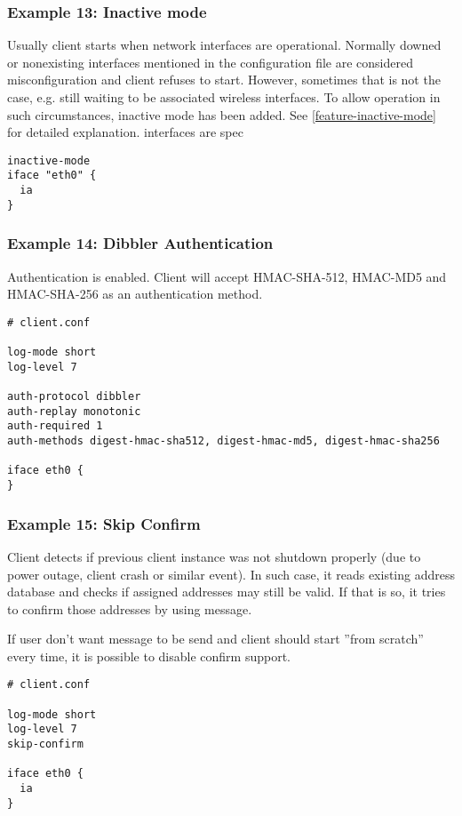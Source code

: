 \subsubsection{Example 13: Inactive mode}
\label{example-client-inactivemode}
Usually client starts when network interfaces are
operational. Normally downed or nonexisting interfaces mentioned in
the configuration file are considered misconfiguration and client
refuses to start. However, sometimes that is not the case, e.g. still
waiting to be associated wireless interfaces. To allow operation in
such circumstances, inactive mode has been added. See
\ref{feature-inactive-mode} for detailed explanation.
interfaces are spec

\begin{lstlisting}
inactive-mode
iface "eth0" {
  ia
}
\end{lstlisting}

\subsubsection{Example 14: Dibbler Authentication}
\label{example-client-auth}
Authentication is enabled. Client will accept HMAC-SHA-512, HMAC-MD5
and HMAC-SHA-256 as an authentication method.

\begin{lstlisting}
# client.conf

log-mode short
log-level 7

auth-protocol dibbler
auth-replay monotonic
auth-required 1
auth-methods digest-hmac-sha512, digest-hmac-md5, digest-hmac-sha256

iface eth0 {
}
\end{lstlisting}

\subsubsection{Example 15: Skip Confirm}
\label{example-client-confirm}
Client detects if previous client instance was not shutdown properly
(due to power outage, client crash or similar event). In such case, it
reads existing address database and checks if assigned addresses may
still be valid. If that is so, it tries to confirm those addresses by
using  message.

If user don't want  message to be send and client should
start ''from scratch'' every time, it is possible to disable confirm
support.

\begin{lstlisting}
# client.conf

log-mode short
log-level 7
skip-confirm

iface eth0 {
  ia
}
\end{lstlisting}

